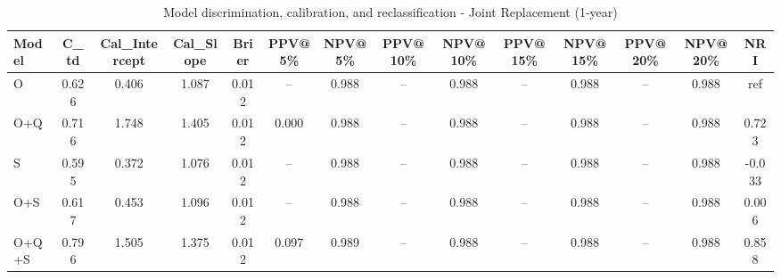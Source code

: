 \begin{table}[htbp]
\centering
\small
\caption{Model discrimination, calibration, and reclassification - Joint Replacement (1-year)}
\label{tab:perf_joint_1y}
\begin{tabular}{lccccccccccccc}
\toprule
Model & C\_td & Cal\_Intercept & Cal\_Slope & Brier & PPV@5\% & NPV@5\% & PPV@10\% & NPV@10\% & PPV@15\% & NPV@15\% & PPV@20\% & NPV@20\% & NRI \\
\midrule
O & 0.626 & 0.406 & 1.087 & 0.012 & -- & 0.988 & -- & 0.988 & -- & 0.988 & -- & 0.988 & ref \\
O+Q & 0.716 & 1.748 & 1.405 & 0.012 & 0.000 & 0.988 & -- & 0.988 & -- & 0.988 & -- & 0.988 & 0.723 \\
S & 0.595 & 0.372 & 1.076 & 0.012 & -- & 0.988 & -- & 0.988 & -- & 0.988 & -- & 0.988 & -0.033 \\
O+S & 0.617 & 0.453 & 1.096 & 0.012 & -- & 0.988 & -- & 0.988 & -- & 0.988 & -- & 0.988 & 0.006 \\
O+Q+S & 0.796 & 1.505 & 1.375 & 0.012 & 0.097 & 0.989 & -- & 0.988 & -- & 0.988 & -- & 0.988 & 0.858 \\
\bottomrule
\end{tabular}
\end{table}